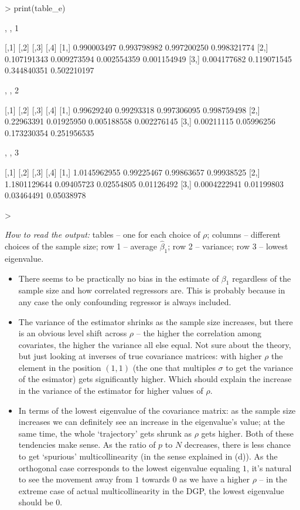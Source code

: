\documentclass[a4paper,12pt,twoside]{article}
\begin{document}
\begin{Schunk}
\begin{Sinput}
> print(table_e)
\end{Sinput}
\begin{Soutput}
, , 1

            [,1]        [,2]        [,3]        [,4]
[1,] 0.990003497 0.993798982 0.997200250 0.998321774
[2,] 0.107191343 0.009273594 0.002554359 0.001154949
[3,] 0.004177682 0.119071545 0.344840351 0.502210197

, , 2

           [,1]       [,2]        [,3]        [,4]
[1,] 0.99629240 0.99293318 0.997306095 0.998759498
[2,] 0.22963391 0.01925950 0.005188558 0.002276145
[3,] 0.00211115 0.05996256 0.173230354 0.251956535

, , 3

             [,1]       [,2]       [,3]       [,4]
[1,] 1.0145962955 0.99225467 0.99863657 0.99938525
[2,] 1.1801129644 0.09405723 0.02554805 0.01126492
[3,] 0.0004222941 0.01199803 0.03464491 0.05038978
\end{Soutput}
\begin{Sinput}
> 
\end{Sinput}
\end{Schunk}

\textit{How to read the output:} tables -- one for each choice of $\rho$;
columns -- different choices of the sample size; 
row 1 -- average $\hat \beta_1$;
row 2 -- variance;
row 3 -- lowest eigenvalue.

\begin{itemize}
  \item There seems to be practically no bias in the estimate of $\beta_1$ regardless
  of the sample size and how correlated regressors are. This is probably because
  in any case the only confounding regressor is always included.
  \item The variance of the estimator shrinks as the sample size increases, but
  there is an obvious level shift across $\rho$ -- the higher the correlation
  among covariates, the higher the variance all else equal. Not sure about the theory,
  but just looking at inverses of true covariance matrices: with higher $\rho$
  the element in the position $(1, 1)$ (the one that multiples $\sigma$
  to get the variance of the esimator) gets significantly higher. Which should explain
  the increase in the variance of the estimator for higher values of $\rho$.
  \item In terms of the lowest eigenvalue of the covariance matrix: as the sample size
  increases we can definitely see an increase in the eigenvalue's value; at the same time,
  the whole `trajectory' gets shrunk as $\rho$ gets higher. Both of these tendencies make sense. 
  As the ratio of $p$ to $N$ decreases, there is less chance to get `spurious' 
  multicollinearity (in the sense explained in (d)). As the orthogonal case 
  corresponds to the lowest eigenvalue equaling $1$, it's natural to see 
  the movement away from $1$ towards $0$ as we have a higher $\rho$ -- in the extreme case
  of actual multicollinearity in the DGP, the lowest eigenvalue should be $0$.
\end{itemize}
\end{document}
